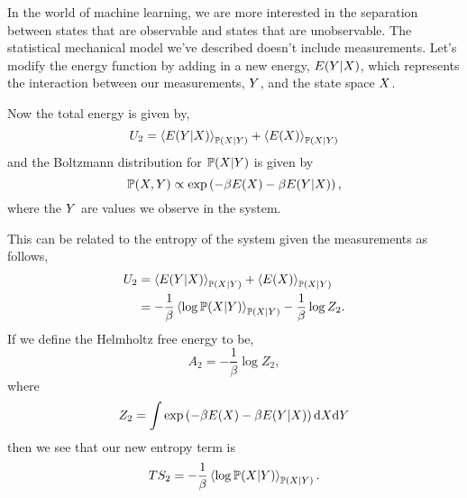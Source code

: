 \documentclass[]{article}
\begin{document}
In the world of machine learning, we are more interested in the
separation between states that are observable and states that are
unobservable. The statistical mechanical model we've described doesn't
include measurements. Let's modify the energy function by adding in a
new energy, \(E(Y | X)\), which represents
the interaction between our measurements, \(Y\), and the
state space \(X\).

Now the total energy is given by, 
\[
U_2 = \left\langle E(Y | X) \right\rangle_{\mathbb{P}(X| Y)} + \left\langle E(X) \right\rangle_{\mathbb{P}(X| Y)}
\] 
and the Boltzmann distribution for
\(\mathbb{P}(X | Y)\) is given by 
\[
\mathbb{P}(X,  Y) \propto \exp \left(-\beta E(X) -\beta E(Y | X)\right),
\] 
where the \(Y\) are values we observe in the system.

This can be related to the entropy of the system given the measurements
as follows, 
\begin{align*}
U_2 & = \left\langle E(Y |  X) \right\rangle_{\mathbb{P}(X |  Y)} + \left\langle E(X) \right\rangle_{\mathbb{P}(X | Y)} \\
& = -\frac{1}{\beta} \left\langle \log \mathbb{P}(X | Y) \right\rangle_{\mathbb{P}(X | Y)} - \frac{1}{\beta}\log Z_2.
\end{align*}
If we define the Helmholtz free energy to be, 
\[
A_2 = -\frac{1}{\beta} \log  Z_2,
\] 
where 
\[
Z_2 = \int \exp \left(-\beta E(X) -\beta E(Y | X)\right) \text{d}X \text{d}Y
\] 
then we see that our new entropy term is 
\[
TS_2 = -\frac{1}{\beta} \left\langle \log \mathbb{P}(X | Y) \right\rangle_{\mathbb{P}(X | Y)}.
\]
\end{document}
